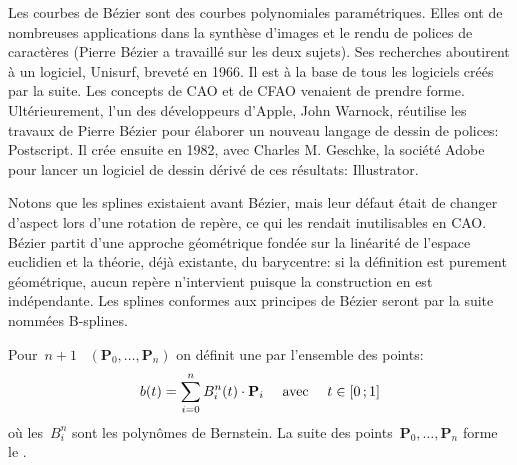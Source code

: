 \begin{histoire}
Les courbes de Bézier sont des courbes polynomiales paramétriques.  Elles ont de nombreuses applications dans la synthèse d'images et le rendu de polices de caractères (Pierre Bézier a travaillé sur les deux sujets). Ses recherches aboutirent à un logiciel, Unisurf, breveté en 1966. Il est à la base de tous les logiciels créés par la suite. Les concepts de CAO et de CFAO venaient de prendre forme. Ultérieurement, l'un des développeurs d'Apple, John Warnock, réutilise les travaux de Pierre Bézier pour élaborer un nouveau langage de dessin de polices: Postscript. Il crée ensuite en 1982, avec Charles M. Geschke, la société Adobe pour lancer un logiciel de dessin dérivé de ces résultats: Illustrator. 
\end{histoire}

Notons que les splines existaient avant Bézier, mais leur défaut était de changer d'aspect lors d'une rotation de repère, ce qui les rendait inutilisables en CAO. Bézier partit d'une approche géométrique fondée sur la linéarité de l'espace euclidien et la théorie, déjà existante, du barycentre: si la définition est purement géométrique, aucun repère n'intervient puisque la construction en est indépendante. Les splines conformes aux principes de Bézier seront par la suite nommées B-splines.  

Pour~$n+1$ ~$(\mathbf{P}_0, \dots, \mathbf{P}_n)$ on définit une  par l'ensemble des points:
\begin{equation}
b(t)=\displaystyle\sum_{i=0}^n B_i^n(t)\cdot\mathbf{P}_i\quad\text{ avec }\quad t \in\mathopen{[}0\,;1\mathclose{]}
\end{equation}
où les~$B_i^n$ sont les polynômes de Bernstein. La suite des points~$\mathbf{P}_0,\ldots,\mathbf{P}_n$ forme le . 

